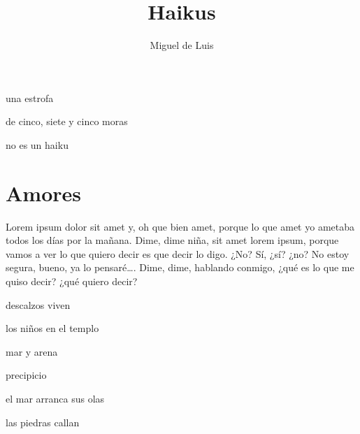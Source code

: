 \documentclass[10pt,spanish,a5paper,twoside=true]{book} %
\title{Haikus}
\author{Miguel de Luis}
\newenvironment{haiku}
{
\clearpage
\vspace*{\fill}
\par
\noindent
\centering
\huge
\doublespacing
} %
{
\vfill
\clearpage} %
\begin{document}
\frontmatter
\maketitle

\mainmatter
\section*{}

\begin{haiku}
una estrofa

de cinco, siete y cinco moras

no es un haiku
\end{haiku}

\chapter{Amores}

Lorem ipsum dolor sit amet y, oh que bien amet, porque lo que amet yo ametaba todos los días por la mañana. Dime, dime niña, sit amet lorem ipsum, porque vamos a ver lo que quiero decir es que decir lo digo. ¿No? Sí, ¿sí? ¿no? No estoy segura, bueno, ya lo pensaré\dots. Dime, dime, hablando conmigo, ¿qué es lo que me quiso decir? ¿qué quiero decir?

\begin{haiku}
descalzos viven

los niños en el templo

mar y arena
\end{haiku}

\begin{haiku}
precipicio

el mar arranca sus olas

las piedras callan
\end{haiku}
\end{document}
